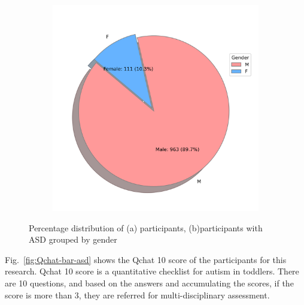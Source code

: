 \documentclass{article}
\begin{document}
\begin{multicols}{2}
\begin{minipage}{\columnwidth}
\begin{figure}[H]
            \begin{subfigure}{\columnwidth}
                \centering
                \includegraphics[width=\textwidth]{images/Gender_Pi_chart(asd).png}
                \caption{}
                \label{fig:gender-pie-chart-asd} %
            \end{subfigure}
            \caption{Percentage distribution of (a) participants, (b)participants with ASD grouped by gender }
            \label{fig:gender-distribution}
        \end{figure}
    \end{minipage}
    \vspace{1.2em}
    
    \noindent
    \hspace*{\parindent}Fig.~\ref{fig:Qchat-bar-asd} shows the Qchat 10 score of the participants for this research. Qchat 10 score is a quantitative checklist for autism in toddlers. There are 10 questions, and based on the answers and accumulating the scores, if the score is more than 3, they are referred for multi-disciplinary assessment.\\
    \end{multicols}
    
\end{document}
